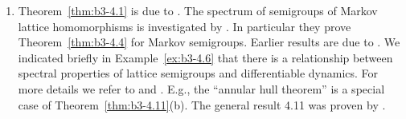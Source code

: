 \begin{enumerate}[label=\emph{Section \arabic*:}, wide]
\item
Theorem~\ref{thm:b3-4.1} is due to \citet{derndinger:1984}.
The spectrum of semigroups of Markov lattice homomorphisms is investigated by \citet{derndingernagel:1979}.
In particular they prove Theorem~\ref{thm:b3-4.4} for Markov semigroups.
Earlier results are due to \citet{scarpellini:1974}.
We indicated briefly in Example~\ref{ex:b3-4.6} that there is a relationship between spectral properties of lattice semigroups and differentiable dynamics.
For more details we refer to \citet{chiconeswanson:1981} and \citet{sackersell:1978}.
E.g., the \enquote{annular hull theorem} is a special case of Theorem~\ref{thm:b3-4.11}(b).
The general result 4.11 was proven by \citet{arendtgreiner:1984}.

\end{enumerate}

